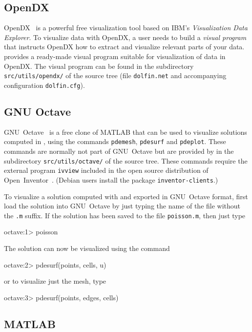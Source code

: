 

\subsection{OpenDX}

OpenDX~\cite{www:OpenDX} is a powerful free visualization tool based
on IBM's \emph{Visualization Data Explorer}. To visualize data with
OpenDX, a user needs to build a \emph{visual program} that instructs
OpenDX how to extract and visualize relevant parts of your
data. \dolfin{} provides a ready-made visual program suitable for
visualization of \dolfin{} data in OpenDX. The visual program can be
found in the subdirectory \texttt{src/utils/opendx/} of the \dolfin{}
source tree (file \texttt{dolfin.net} and accompanying configuration
\texttt{dolfin.cfg}).

\subsection{GNU Octave}

GNU~Octave~\cite{www:Octave} is a free clone of MATLAB that can be
used to visualize solutions computed in \dolfin{}, using the commands
\texttt{pdemesh}, \texttt{pdesurf} and \texttt{pdeplot}. These
commands are normally not part of GNU~Octave but are
provided by \dolfin{} in the subdirectory \texttt{src/utils/octave/} of
the \dolfin{} source tree. These commands require the external program
\texttt{ivview} included in the open source distribution of
Open~Inventor~\cite{www:OpenInventor}. (Debian users install the
package \texttt{inventor-clients}.)

To visualize a solution computed with \dolfin{} and exported in
GNU~Octave format, first load the solution into GNU~Octave by just
typing the name of the file without the \texttt{.m} suffix. If the
solution has been saved to the file \texttt{poisson.m}, then just type
\begin{code}
  octave:1> poisson
\end{code}
The solution can now be visualized using the command
\begin{code}
  octave:2> pdesurf(points, cells, u)
\end{code}
or to visualize just the mesh, type
\begin{code}
  octave:3> pdesurf(points, edges, cells)
\end{code}

\subsection{MATLAB}

